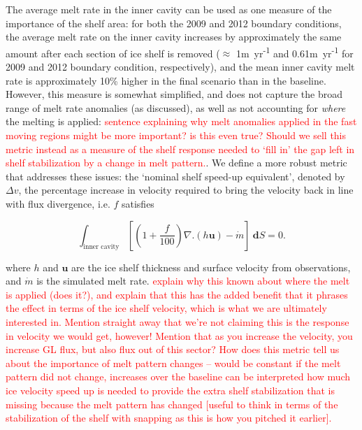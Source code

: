\documentclass[draft]{agujournal2019}
\newcommand{\red}[1]{\textcolor{red}{#1}}
\begin{document}
The average melt rate in the inner cavity can be used as one measure of the importance of the shelf area: for both the 2009 and 2012 boundary conditions, the average melt rate on the inner cavity increases by approximately the same amount after each section of ice shelf is removed ($\approx$ 1m~yr\textsuperscript{-1} and 0.61m~yr\textsuperscript{-1} for 2009 and 2012 boundary condition, respectively), and the mean inner cavity melt rate is approximately 10\% higher in the final scenario than in the baseline. However, this measure is somewhat simplified, and does not capture the broad range of melt rate anomalies (as discussed), as well as not accounting for \emph{where} the melting is applied: \red{sentence explaining why melt anomalies applied in the fast moving regions might be more important? is this even true? Should we sell this metric instead as a measure of the shelf response needed to `fill in' the gap left in shelf stabilization by a change in melt pattern.}. We define a more robust metric that addresses these issues: the `nominal shelf speed-up equivalent', denoted by $\Delta v$, the percentage increase in velocity required to bring the velocity back in line with flux divergence, i.e. $f$ satisfies
    \begin{linenomath*}
    \begin{equation}
    \int_{\text{inner cavity}} \left[\left(1+ \frac{f}{100}\right)\nabla.(h\mathbf{u}) - \dot{m}\right]~\mathbf{d}S = 0.
    \end{equation}
    \end{linenomath*}
    where $h$ and $\mathbf{u}$ are the ice shelf thickness and surface velocity from observations, and $\dot{m}$ is the simulated melt rate.
\red{explain why this known about where the melt is applied (does it?), and explain that this has the added benefit that it phrases the effect in terms of the ice shelf velocity, which is what we are ultimately interested in. Mention straight away that we're not claiming this is the response in velocity we would get, however! Mention that as you increase the velocity, you increase GL flux, but also flux out of this sector? How does this metric tell us about the importance of melt pattern changes -- would be constant if the melt pattern did not change, increases over the baseline can be interpreted how much ice velocity speed up is needed to provide the extra shelf stabilization that is missing because the melt pattern has changed [useful to think in terms of the stabilization of the shelf with snapping as this is how you pitched it earlier].}
\end{document}
